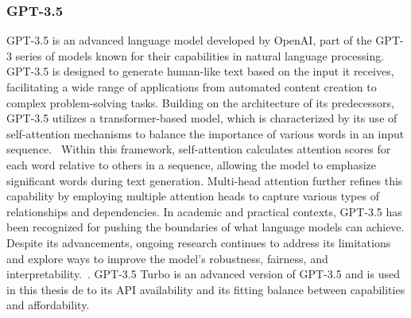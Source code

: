 \subsubsection*{GPT-3.5}\label{sec:gpt3.5}
GPT-3.5 is an advanced language model developed by OpenAI, part of the GPT-3 series of models known for their capabilities in natural language processing. GPT-3.5 is designed to generate human-like text based on the input it receives, facilitating a wide range of applications from automated content creation to complex problem-solving tasks. Building on the architecture of its predecessors, GPT-3.5 utilizes a transformer-based model, which is characterized by its use of self-attention mechanisms to balance the importance of various words in an input sequence.~\cite{latif_fine-tuning_2024} Within this framework, self-attention calculates attention scores for each word relative to others in a sequence, allowing the model to emphasize significant words during text generation. Multi-head attention further refines this capability by employing multiple attention heads to capture various types of relationships and dependencies. In academic and practical contexts, GPT-3.5 has been recognized for pushing the boundaries of what language models can achieve. Despite its advancements, ongoing research continues to address its limitations and explore ways to improve the model's robustness, fairness, and interpretability.~\cite{brown_language_2020}. GPT-3.5 Turbo is an advanced version of GPT-3.5 and is used in this thesis de to its API availability and its fitting balance between capabilities and affordability.

